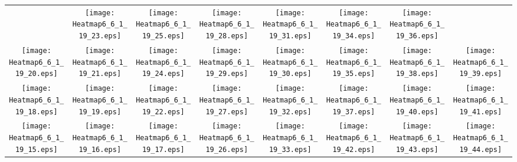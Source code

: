 \documentclass{standalone}
\begin{document}
\renewcommand{\arraystretch}{0}
\setlength{\tabcolsep}{0pt}
\begin{tabular}{ *8{c} }
 & \texttt{[image: Heatmap6\_6\_1\_19\_23.eps]} & \texttt{[image: Heatmap6\_6\_1\_19\_25.eps]} & \texttt{[image: Heatmap6\_6\_1\_19\_28.eps]} & \texttt{[image: Heatmap6\_6\_1\_19\_31.eps]} & \texttt{[image: Heatmap6\_6\_1\_19\_34.eps]} & \texttt{[image: Heatmap6\_6\_1\_19\_36.eps]} &  \\
\texttt{[image: Heatmap6\_6\_1\_19\_20.eps]} & \texttt{[image: Heatmap6\_6\_1\_19\_21.eps]} & \texttt{[image: Heatmap6\_6\_1\_19\_24.eps]} & \texttt{[image: Heatmap6\_6\_1\_19\_29.eps]} & \texttt{[image: Heatmap6\_6\_1\_19\_30.eps]} & \texttt{[image: Heatmap6\_6\_1\_19\_35.eps]} & \texttt{[image: Heatmap6\_6\_1\_19\_38.eps]} & \texttt{[image: Heatmap6\_6\_1\_19\_39.eps]} \\
\texttt{[image: Heatmap6\_6\_1\_19\_18.eps]} & \texttt{[image: Heatmap6\_6\_1\_19\_19.eps]} & \texttt{[image: Heatmap6\_6\_1\_19\_22.eps]} & \texttt{[image: Heatmap6\_6\_1\_19\_27.eps]} & \texttt{[image: Heatmap6\_6\_1\_19\_32.eps]} & \texttt{[image: Heatmap6\_6\_1\_19\_37.eps]} & \texttt{[image: Heatmap6\_6\_1\_19\_40.eps]} & \texttt{[image: Heatmap6\_6\_1\_19\_41.eps]} \\
\texttt{[image: Heatmap6\_6\_1\_19\_15.eps]} & \texttt{[image: Heatmap6\_6\_1\_19\_16.eps]} & \texttt{[image: Heatmap6\_6\_1\_19\_17.eps]} & \texttt{[image: Heatmap6\_6\_1\_19\_26.eps]} & \texttt{[image: Heatmap6\_6\_1\_19\_33.eps]} & \texttt{[image: Heatmap6\_6\_1\_19\_42.eps]} & \texttt{[image: Heatmap6\_6\_1\_19\_43.eps]} & \texttt{[image: Heatmap6\_6\_1\_19\_44.eps]} \\

\end{tabular}
\end{document}
